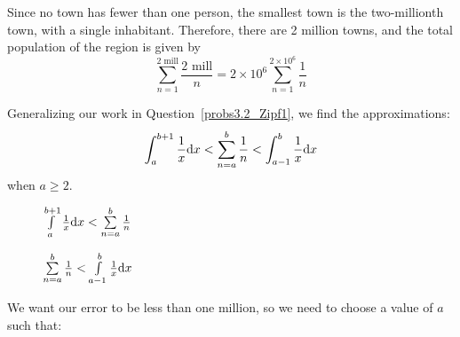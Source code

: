 \begin{solution}
	Since no town has fewer than one person, the smallest town is the two-millionth town, with a single inhabitant. Therefore, there are 2 million towns, and the total population of the region is given by
	\[\sum_{n=1}^{2 \text{ mill}}\frac{2\text{ mill}}{n}=2\times 10^6 \sum_{n=1}^{2 \times 10^6}\frac{1}{n}\]

	Generalizing our work in Question~\ref{probs3.2_Zipf1}, we find the approximations:
	\[\int_a^{b+1}\frac{1}{x}\mathrm{d}x<\sum_{n=a}^b \frac{1}{n} < \int_{a-1}^{b}\frac{1}{x}\mathrm{d}x\]
	when $a \ge 2$.

	\begin{figure}[h]\centering
		\caption{$\int\limits_a^{b+1}\frac{1}{x}\mathrm{d}x<\sum\limits_{n=a}^b \frac{1}{n}$}
	\end{figure}

\begin{figure}[h]\centering
	\caption{$\sum\limits_{n=a}^b \frac{1}{n}<\int\limits_{a-1}^{b}\frac{1}{x}\mathrm{d}x$}
\end{figure}

	We want our error to be less than one million, so we need to choose a value of $a$ such that:


\end{solution}
